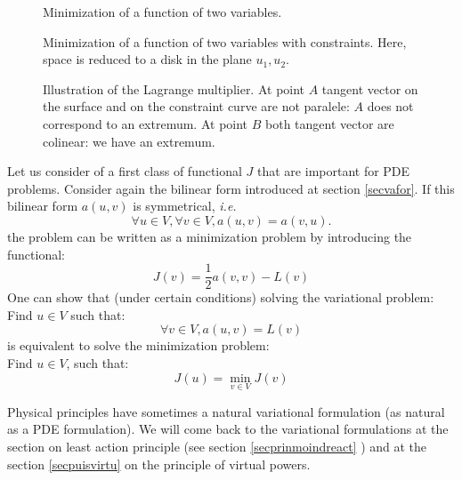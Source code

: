 \documentclass[12pt]{book}
\begin{document}
\begin{figure}[htb]
 \centerline{}   
 \caption{Minimization of a function of two variables.}
 \label{figcontraintesans}
\end{figure}
\begin{figure}[htb]
 \centerline{}   
 \caption{Minimization of a function of two variables with
 constraints. Here, space
   is reduced to a disk in the plane $u_1,u_2$. }
 \label{figcontrainteavec}
\end{figure}
\begin{figure}[htb]
 \centerline{}   
 \caption{Illustration of the Lagrange multiplier. At point $A$ tangent vector on the surface and on the constraint curve are not paralele: $A$ does not correspond to an extremum. At point $B$ both tangent vector are colinear: we have an extremum.}
 \label{figcontrainteaveclag}
\end{figure}

\begin{exmp}
Let us consider of a first class of functional $J$ that are important for PDE
problems. 
Consider again the bilinear form introduced at section \ref{secvafor}.
If this bilinear form  $a(u,v)$ is symmetrical, {\it i.e.}
\begin{equation}
\forall u\in V, \forall v\in V, a(u,v)=a(v,u).
\end{equation}
the problem can be written as a minimization problem by introducing the functional:
\begin{equation}
J(v)=\frac{1}{2}a(v,v)-L(v)
\end{equation}
One can show that (under certain conditions) solving the variational problem:\\
Find $u\in V$ such that: 
\begin{equation}
\forall v\in V, a(u,v)=L(v)
\end{equation}
is equivalent to solve the minimization problem:\\
Find $u\in V$, such that:
\begin{equation}
J(u)=\min_{v\in V} J(v)
\end{equation}

\end{exmp}

Physical principles have sometimes a natural variational formulation (as
natural as a PDE formulation).
We will come back to the variational formulations at the section on least
action principle (see section  \ref{secprinmoindreact} ) and at the section
\ref{secpuisvirtu} on the principle of virtual powers.
\end{document}
